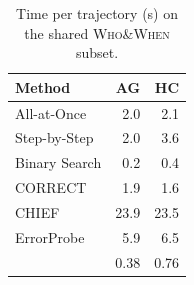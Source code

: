 \begin{table}
\vspace{-0.7\baselineskip}
\centering
\footnotesize
\setlength{\tabcolsep}{8pt}
\caption{Time per trajectory (s) on the shared \textsc{Who\&When} subset.}
\label{tab:cost-judges}
\begin{tabular}{l rr}
\toprule
Method & AG & HC \\
\midrule
All-at-Once   & 2.0  & 2.1 \\
Step-by-Step  & 2.0  & 3.6 \\
Binary Search & 0.2  & 0.4 \\
CORRECT       & 1.9  & 1.6 \\
CHIEF         & 23.9 & 23.5 \\
ErrorProbe    & 5.9  & 6.5 \\
\midrule
\rowcolor{gray!10}
\soap{}       & 0.38 & 0.76 \\
\bottomrule
\end{tabular}
\vspace{-\baselineskip}
\end{table}




